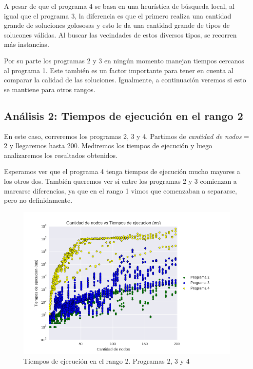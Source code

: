 \par A pesar de que el programa 4 se basa en una heurística de búsqueda local, al igual que el programa 3, la diferencia es que el primero realiza una cantidad grande de soluciones golososas y esto le da una cantidad grande de tipos de solucones válidas. Al buscar las vecindades de estos diversos tipos, se recorren más instancias.

\par Por su parte los programas 2 y 3 en ningún momento manejan tiempos cercanos al programa 1. Este también es un factor importante para tener en cuenta al comparar la calidad de las soluciones. Igualmente, a continuación veremos si esto se mantiene para otros rangos.

\subsection{Análisis 2: Tiempos de ejecución en el rango 2}

\par En este caso, correremos los programas 2, 3 y 4. Partimos de \textit{cantidad de nodos} = 2 y llegaremos hasta 200. Mediremos los tiempos de ejecución y luego analizaremos los resultados obtenidos.

\par Esperamos ver que el programa 4 tenga tiempos de ejecución mucho mayores a los otros dos. También queremos ver si entre los programas 2 y 3 comienzan a marcarse diferencias, ya que en el rango 1 vimos que comenzaban a separarse, pero no definidamente.

\begin{figure}[H]
  \begin{center}
    \includegraphics[width=\textwidth]{img/ejercicio5/tiempos_r2.png}
    \caption{Tiempos de ejecución en el rango 2. Programas 2, 3 y 4}
    \label{fig: ej5_tiempos_r2}
  \end{center}
\end{figure}

